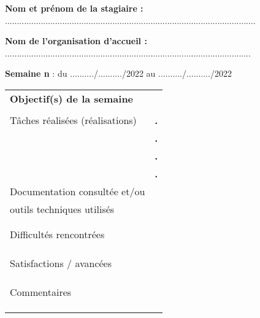 \documentclass[a4paper,11pt]{article}
\makeatletter
\newcommand{\mktitle}{\@maketitle}
\makeatother
\begin{document}
\mktitle\vspace{-.2cm}

\noindent\textbf{Nom et prénom de la stagiaire :} .........................................................................................................\vspace{.4cm}

\noindent\textbf{Nom de l'organisation d'accueil :} .......................................................................................................\vspace{.4cm}

\noindent\textbf{Semaine n} : du ........../........../2022 au ........../........../2022\vspace{-.2cm}

\begin{center}
\begin{tabular}{|C{6cm}|p{10.3cm}|}
	\hline
	\textbf{Objectif(s) de la semaine} &\\&\\
	\hline
	Tâches réalisées (réalisations) & \hspace{.2cm}\huge\textbf{.}\\&\hspace{.2cm}\huge\textbf{.}\\&\hspace{.2cm}\huge\textbf{.}\\& \hspace{.2cm}\huge\textbf{.}\\
	\hline
	Documentation consultée et/ou &\\
	outils techniques utilisés &\\&\\&\\
	\hline
	Difficultés rencontrées &\\&\\&\\&\\
	\hline
	Satisfactions / avancées &\\&\\&\\&\\
	\hline
	Commentaires &\\&\\&\\&\\
	\hline
\end{tabular}\vspace{.35cm}
\begin{tabular}{|C{6cm}|p{10.3cm}|}

\end{tabular}
\end{center}
\end{document}
